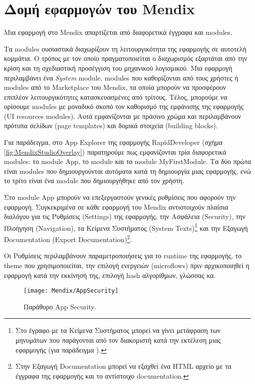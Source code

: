     \section{Δομή εφαρμογών του Mendix}
        Μια εφαρμογή στο Mendix απαρτίζεται από διαφορετικά έγγραφα και modules.

        Τα modules ουσιαστικά διαχωρίζουν τη λειτουργικότητα της εφαρμογής σε αυτοτελή κομμάτια. Ο τρόπος με τον οποίο πραγματοποιείται ο διαχωρισμός εξαρτάται από την κρίση και τη σχεδιαστική προσέγγιση του μηχανικού λογισμικού. Μια εφαρμογή περιλαμβάνει ένα \textit{System} module, modules που καθορίζονται από τους χρήστες ή modules από το Marketplace του Mendix, τα οποία μπορούν να προσφέρουν επιπλέον λειτουργικότητες κατασκευασμένες από τρίτους. Τέλος, μπορούμε να ορίσουμε modules με μοναδικό σκοπό τον καθορισμό της εμφάνισης της εφαρμογής (UI resources modules). Αυτά εμφανίζονται με πράσινο χρώμα και περιλαμβάνουν πρότυπα σελίδων (page templates) και δομικά στοιχεία (building blocks).

        Για παράδειγμα, στο App Explorer της εφαρμογής RapidDeveloper (σχήμα \ref{fig:MendixStudioOverlay}) παρατηρούμε πως εμφανίζονται τρία διαφορετικά modules: το module App, το module  και το module {MyFirstModule}. Τα δύο πρώτα είναι modules που δημιουργούνται αυτόματα κατά τη δημιουργία μιας εφαρμογής, ενώ το τρίτο είναι ένα module που δημιουργήθηκε από τον χρήστη.

        Στο module App μπορούν να επεξεργαστούν γενικές ρυθμίσεις που αφορούν την εφαρμογή. Συγκεκριμένα σε κάθε εφαρμογή του Mendix αντιστοιχούν πλαίσια διαλόγου για τις Ρυθμίσεις (Settings) της εφαρμογής, την Ασφάλεια (Security), την Πλοήγηση (Navigation), τα Κείμενα Συστήματος (System Texts)\footnote{Στο έγραφο με τα Κείμενα Συστήματος μπορεί να γίνει μετάφραση των μηνυμάτων που παράγονται από τον διακομιστή κατά την εκτέλεση μιας εφαρμογής (για παράδειγμα ).} και την Εξαγωγή Documentation (Export Documentation)\footnote{Στην Εξαγωγή Documentation μπορεί να εξαχθεί ένα HTML αρχείο με τα έγγραφα της εφαρμογής και το αντίστοιχο documentation.}.

        Οι Ρυθμίσεις περιλαμβάνουν παραμετροποιήσεις για το runtime της εφαρμογής, το theme που χρησιμοποιείται, την επιλογή ενεργειών (microflows) πριν αρχικοποιηθεί η εφαρμογή κατά την εκκίνησή της, επιλογή hash αλγορίθμων, γλώσσας κα.

        \begin{figure}[h!] \noindent \centering
                \texttt{[image: Mendix/AppSecurity]}
                \caption{\centering Παράθυρο App Security.}
        \end{figure}

